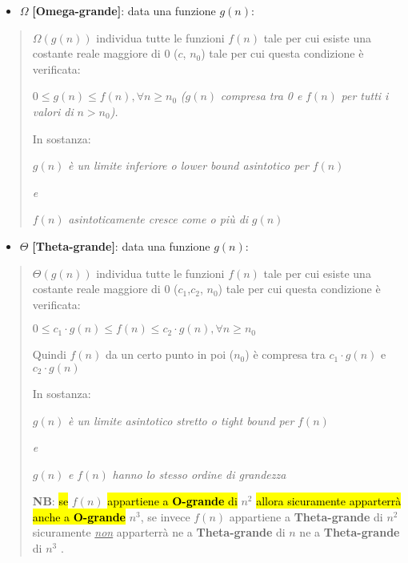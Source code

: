 \begin{itemize}
\item
  \(\Omega\) \textbf{{[}Omega-grande{]}}: data una funzione \(g(n)\):
\end{itemize}

\begin{quote}
\(\Omega(g(n))\) individua tutte le funzioni \(f(n)\) tale per cui
esiste una costante reale maggiore di 0 (\(c\), \(n_{0}\)) tale per cui
questa condizione è verificata:

\(0 \leq g(n) \leq f(n),\forall n \geq n_{0}\) \emph{(}\(g(n)\)
\emph{compresa tra 0 e} \(f(n)\) \emph{per tutti i valori di}
\(n > n_{0}\)\emph{).}

In sostanza:

\(g(n)\) \emph{è un limite inferiore o lower bound asintotico per}
\(f(n)\)

\emph{e}

\(f(n)\) \emph{asintoticamente cresce come o più di} \(g(n)\)
\end{quote}

\begin{itemize}
\item
  \(\Theta\) \textbf{{[}Theta-grande{]}}: data una funzione \(g(n)\):
\end{itemize}

\begin{quote}
\(\Theta(g(n))\) individua tutte le funzioni \(f(n)\) tale per cui
esiste una costante reale maggiore di 0 (\(c_{1}\),\(c_{2}\), \(n_{0}\))
tale per cui questa condizione è verificata:

\(0 \leq c_{1} \cdot g(n) \leq f(n) \leq c_{2} \cdot g(n),\forall n \geq n_{0}\)

Quindi \(f(n)\) da un certo punto in poi (\(n_{0}\)) è compresa tra
\(c_{1} \cdot g(n)\) e \(c_{2} \cdot g(n)\)

In sostanza:

\(g(n)\) \emph{è un limite asintotico stretto o tight bound per}
\(f(n)\)

\emph{e}

\(g(n)\) \emph{e} \(f(n)\) \emph{hanno lo stesso ordine di grandezza}

\textbf{NB}: \hl{se} \(f(n)\) \hl{appartiene a \textbf{O-grande} di}
\(n^{2}\) \hl{allora sicuramente apparterrà anche a \textbf{O-grande}}
\(n^{3}\), se invece \(f(n)\) appartiene a \textbf{Theta-grande} di
\(n^{2}\) sicuramente \emph{\ul{non}} apparterrà ne a
\textbf{Theta-grande} di \(n\) ne a \textbf{Theta-grande} di \(n^{3}\) .
\end{quote}

